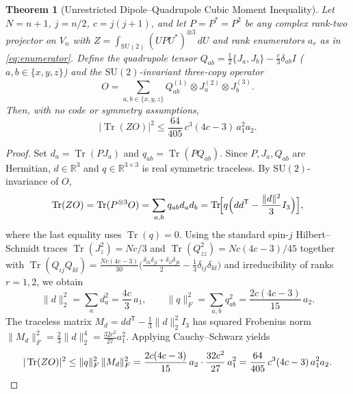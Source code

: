 \documentclass[11pt,letterpaper]{article}
\newtheorem{theorem}{Theorem}[section]
\theoremstyle{definition}
\theoremstyle{remark}
\newcommand{\Tr}{\operatorname{Tr}}
\newcommand{\SU}{\mathrm{SU}}
\newcommand{\R}{\mathbb{R}}
\begin{document}
\begin{theorem}[Unrestricted Dipole--Quadrupole Cubic Moment Inequality]\label{thm:cubic}
Let $N=n+1$, $j=n/2$, $c=j(j+1)$, and let $P=P^*=P^2$ be any complex rank-two projector on $V_n$ with $Z = \int_{\SU(2)} (UPU^*)^{\otimes 3}\,dU$ and rank enumerators $a_r$ as in \eqref{eq:enumerator}. Define the quadrupole tensor $Q_{ab} = \frac{1}{2}\{J_a,J_b\} - \frac{c}{3}\delta_{ab} I$ ($a,b \in \{x,y,z\}$) and the $\SU(2)$-invariant three-copy operator
\begin{equation}\label{eq:O-op}
  O = \sum_{a,b \in \{x,y,z\}} Q_{ab}^{(1)} \otimes J_a^{(2)} \otimes J_b^{(3)}.
\end{equation}
Then, with no code or symmetry assumptions,
\begin{equation}\label{eq:cubic-ineq}
  \bigl|\Tr(ZO)\bigr|^2 \le \frac{64}{405}\, c^3(4c-3)\, a_1^2 a_2.
\end{equation}
\end{theorem}
\begin{proof}
Set $d_a = \Tr(P J_a)$ and $q_{ab} = \Tr(P Q_{ab})$. Since $P, J_a, Q_{ab}$ are Hermitian, $d \in \R^3$ and $q \in \R^{3\times 3}$ is real symmetric traceless. By $\SU(2)$-invariance of $O$,
\[
  \Tr(ZO) = \Tr(P^{\otimes 3} O) = \sum_{a,b} q_{ab} d_a d_b = \Tr\!\Bigl[q\Bigl(dd^{\mathsf T} - \frac{\|d\|^2}{3}I_3\Bigr)\Bigr],
\]
where the last equality uses $\Tr(q)=0$. Using the standard spin-$j$ Hilbert--Schmidt traces $\Tr(J_z^2) = Nc/3$ and $\Tr(Q_{zz}^2) = Nc(4c-3)/45$ together with $\Tr(Q_{ij}Q_{kl}) = \frac{Nc(4c-3)}{30}\bigl(\frac{\delta_{ik}\delta_{jl}+\delta_{il}\delta_{jk}}{2}-\frac{1}{3}\delta_{ij}\delta_{kl}\bigr)$ and irreducibility of ranks $r=1,2$, we obtain
\[
  \|d\|_2^2 = \sum_a d_a^2 = \frac{4c}{3}\,a_1, \qquad
  \|q\|_F^2 = \sum_{a,b} q_{ab}^2 = \frac{2c(4c-3)}{15}\,a_2.
\]
The traceless matrix $M_d = dd^{\mathsf T} - \frac{1}{3}\|d\|_2^2 I_3$ has squared Frobenius norm $\|M_d\|_F^2 = \frac{2}{3}\|d\|_2^4 = \frac{32c^2}{27}a_1^2$. Applying Cauchy--Schwarz yields
\[
  |\Tr(ZO)|^2 \le \|q\|_F^2 \, \|M_d\|_F^2 = \frac{2c(4c-3)}{15}\,a_2 \cdot \frac{32c^2}{27}\,a_1^2 = \frac{64}{405}\, c^3(4c-3)\, a_1^2 a_2. \qedhere
\]
\end{proof}
\end{document}
